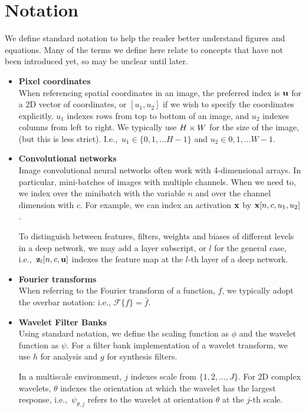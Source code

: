 \section{Notation}
We define standard notation to help the reader better understand figures and
equations. Many of the terms we define here relate to concepts that have not been
introduced yet, so may be unclear until later.

\begin{itemize}
  \item \textbf{Pixel coordinates}\\
    When referencing spatial coordinates in an image, the preferred index
    is $\mathbf{u}$ for a 2D vector of coordinates, or $[u_1,u_2]$ if we wish to
    specify the coordinates explicitly. $u_1$ indexes rows from top to bottom
    of an image, and $u_2$ indexes columns from left to right. We typically use
    $H\times W$ for the size of the image, (but this is less strict). I.e.,\ 
    $u_1 \in \{0, 1, \ldots H-1\}$ and $u_2 \in {0, 1, \ldots W-1}$. 

  \item \textbf{Convolutional networks}\\
    Image convolutional neural networks often work with 4-dimensional arrays. In particular,
    mini-batches of images with multiple channels. When we need to, we index over the 
    minibatch with the variable $n$ and over the channel dimension with $c$. For example, we can
    index an activation $\mathbf{x}$ by $\mathbf{x}[n, c, u_1, u_2]$.

    To distinguish between features, filters, weights and biases of different
    levels in a deep network, we may add a layer subscript, or $l$ for the
    general case, i.e.,\ $\mathbf{z}_l[n, c, \mathbf{u}]$ indexes the feature map at the $l$-th
    layer of a deep network. 
    
  \item \textbf{Fourier transforms}\\
    When referring to the Fourier transform of a function, $f$, we typically
    adopt the overbar notation: i.e., $\mathcal{F}\{f\} = \bar{f}$. 

  \item \textbf{Wavelet Filter Banks}\\
    Using standard notation, we define the scaling function as $\phi$ and the wavelet function 
    as $\psi$. For a filter bank implementation of a wavelet transform, we use $h$ for analysis and
    $g$ for synthesis filters.    

    In a multiscale environment, $j$ indexes scale from $\{1,2, \ldots, J\}$. For 2D complex
    wavelets, $\theta$ indexes the orientation at which the wavelet has the largest response, i.e.,\
    $\psi_{\theta, j}$ refers to the wavelet at orientation $\theta$ at the $j$-th scale.

\end{itemize}
